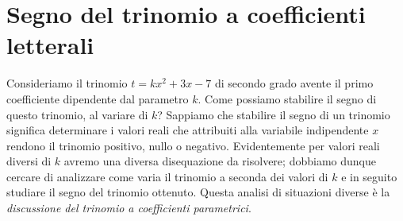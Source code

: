 \section{Segno del trinomio a coefficienti letterali}
Consideriamo il trinomio $t=kx^2+3x-7$ di secondo grado avente il primo coefficiente dipendente dal parametro $k$. Come possiamo stabilire il segno di questo trinomio, al variare di $k$?
Sappiamo che stabilire il segno di un trinomio significa determinare i valori reali che attribuiti alla variabile indipendente $x$ rendono il trinomio positivo, nullo o negativo. Evidentemente per valori reali diversi di $k$ avremo una diversa disequazione da risolvere; dobbiamo dunque cercare di analizzare come varia il trinomio a seconda dei valori di $k$ e in seguito studiare il segno del trinomio ottenuto. Questa analisi di situazioni diverse è la \textit{discussione del trinomio a coefficienti parametrici}.

